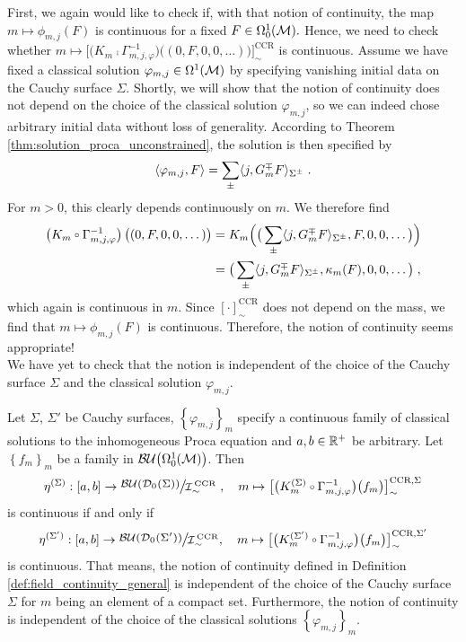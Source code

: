 First, we again would like to check if, with that notion of continuity, the map $m \mapsto \phi_{m,j}(F)$ is continuous for a fixed $F \in \Omega^1_0(\mathcal{M}).$
Hence, we need to check whether $m \mapsto \big[ \big( K_m \comp \Gamma^{-1}_{m,j,\varphi}\big)\big( (0,F,0,0,\dots) \big) \big]_\sim^\text{CCR}$ is continuous. Assume we have fixed a classical solution $\varphi_{m,j} \in \Omega^1(\mathcal{M})$ by specifying vanishing initial data on the Cauchy surface $\Sigma$. Shortly, we will show that the notion of continuity does not depend on the choice of the classical solution $\varphi_{m,j}$, so we can indeed chose arbitrary initial data without loss of generality. According to Theorem \ref{thm:solution_proca_unconstrained}, the solution is then specified by
\begin{align}
	\langle \varphi_{m,j} , F \rangle = \sum\limits_\pm \langle j , G_m^\mp F \rangle_{\Sigma^\pm} \;.
\end{align}
For $m > 0$, this clearly depends continuously on $m$. We therefore find
\begin{align}
\left( K_m \comp \Gamma^{-1}_{m,j,\varphi}\right)\big( (0,F,0,0,\dots) \big)
&= K_m \Big( \big(   \sum\limits_\pm \langle j , G_m^\mp F \rangle_{\Sigma^\pm} , F,0,0,\dots\big)  \Big) \notag\\
&=  \big(   \sum\limits_\pm \langle j , G_m^\mp F \rangle_{\Sigma^\pm} , \kappa_m(F),0,0,\dots\big)  \formspace,
\end{align}
which again is continuous in $m$. Since $[\cdot]_\sim^\text{CCR}$ does not depend on the mass, we find that $m \mapsto \phi_{m,j}(F)$ is continuous. Therefore, the notion of continuity seems appropriate!\\
We have yet to check that the notion is independent of the choice of the Cauchy surface $\Sigma$ and the classical solution $\varphi_{m,j}$.
\begin{lemma}
	Let $\Sigma$, $\Sigma'$ be Cauchy surfaces, $\left\{\varphi_{m,j} \right\}_m$ specify a continuous family of classical solutions to the inhomogeneous Proca equation and $a,b \in \mathbb{R}^+$ be arbitrary. Let $\left\{ f_m\right\}_m$ be a family in ${\mathcal{BU}\big(\Omega^1_0(\mathcal{M})\big)}$. Then
	\begin{align*}
	\eta^{(\Sigma)} : [ a , b] \to {\Quotientscale{\BU(\Dzs  )}{\ICCR}}\hspace{1mm}, \quad m \mapsto \big[ \big( K^{(\Sigma)}_m \comp \Gamma^{-1}_{m,j,\varphi} \big) \big(f_m\big) \big]_\sim^{\text{CCR}, \Sigma}
	\end{align*}
	is continuous if and only if
	\begin{align*}
	\eta^{(\Sigma')} : [ a , b] \to {\Quotientscale{\BU(\Dzsp)}{\ICCR}}, \quad m \mapsto\big[ \big( K^{(\Sigma')}_m \comp \Gamma^{-1}_{m,j,\varphi} \big) \big(f_m\big) \big]_\sim^{\text{CCR}, \Sigma'}
	\end{align*}
	is continuous.
	That means, the notion of continuity defined in Definition \ref{def:field_continuity_general} is independent of the choice of the Cauchy surface $\Sigma$ for $m$ being an element of a compact set.
	Furthermore, the notion of continuity is independent of the choice of the classical solutions $\left\{\varphi_{m,j} \right\}_m$.
\end{lemma}
